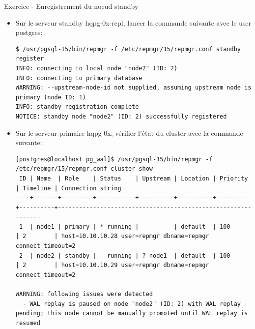 \begin{frame}[fragile]{Exercice - Enregistrement du noeud standby}

   \begin{itemize}
      \item Sur le serveur standby hqpg-0x-repl, lancer la commande suivante avec le user postgres:
\begin{tiny}
\begin{Verbatim}[commandchars=\&\{\}]
$ /usr/pgsql-15/bin/repmgr -f /etc/repmgr/15/repmgr.conf standby register
INFO: connecting to local node "node2" (ID: 2)
INFO: connecting to primary database
WARNING: --upstream-node-id not supplied, assuming upstream node is primary (node ID: 1)
INFO: standby registration complete
NOTICE: standby node "node2" (ID: 2) successfully registered
\end{Verbatim}
\end{tiny}
      \item Sur le serveur primaire hqpg-0x, vérifier l'état du cluster avec la commande suivante:
\begin{tiny}
\begin{Verbatim}[commandchars=\&\{\}]
[postgres@localhost pg_wal]$ /usr/pgsql-15/bin/repmgr -f /etc/repmgr/15/repmgr.conf cluster show
 ID | Name  | Role    | Status    | Upstream | Location | Priority | Timeline | Connection string                                           
----+-------+---------+-----------+----------+----------+----------+----------+--------------------------------------------------------------
 1  | node1 | primary | * running |          | default  | 100      | 2        | host=10.10.10.28 user=repmgr dbname=repmgr connect_timeout=2
 2  | node2 | standby |   running | ? node1  | default  | 100      | 2        | host=10.10.10.29 user=repmgr dbname=repmgr connect_timeout=2

WARNING: following issues were detected
  - WAL replay is paused on node "node2" (ID: 2) with WAL replay pending; this node cannot be manually promoted until WAL replay is resumed
\end{Verbatim}
\end{tiny}
   \end{itemize}

\end{frame}


